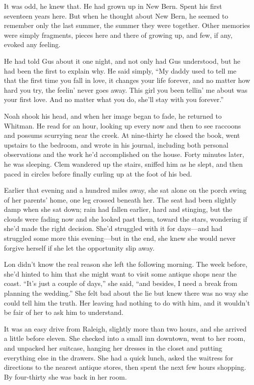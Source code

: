 \documentclass[10pt, twoside, openright]{book}
\begin{document}
It was odd, he knew that. He had grown up in New Bern. Spent his first
seventeen years here. But when he thought about New Bern, he seemed to
remember only the last summer, the summer they were together. Other
memories were simply fragments, pieces here and there of growing up, and
few, if any, evoked any feeling.

He had told Gus about it one night, and not only had Gus understood, but
he had been the first to explain why. He said simply, ``My daddy used to
tell me that the first time you fall in love, it changes your life
forever, and no matter how hard you try, the feelin' never goes away.
This girl you been tellin' me about was your first love. And no matter
what you do, she'll stay with you forever.''

Noah shook his head, and when her image began to fade, he returned to
Whitman. He read for an hour, looking up every now and then to see
raccoons and possums scurrying near the creek. At nine-thirty he closed
the book, went upstairs to the bedroom, and wrote in his journal,
including both personal observations and the work he'd accomplished on
the house. Forty minutes later, he was sleeping. Clem wandered up the
stairs, sniffed him as he slept, and then paced in circles before
finally curling up at the foot of his bed.

Earlier that evening and a hundred miles away, she sat alone on the
porch swing of her parents' home, one leg crossed beneath her. The seat
had been slightly damp when she sat down; rain had fallen earlier, hard
and stinging, but the clouds were fading now and she looked past them,
toward the stars, wondering if she'd made the right decision. She'd
struggled with it for days---and had struggled some more this
evening---but in the end, she knew she would never forgive herself if
she let the opportunity slip away.

Lon didn't know the real reason she left the following morning. The week
before, she'd hinted to him that she might want to visit some antique
shops near the coast. ``It's just a couple of days,'' she said, ``and
besides, I need a break from planning the wedding.'' She felt bad about
the lie but knew there was no way she could tell him the truth. Her
leaving had nothing to do with him, and it wouldn't be fair of her to
ask him to understand.

It was an easy drive from Raleigh, slightly more than two hours, and she
arrived a little before eleven. She checked into a small inn downtown,
went to her room, and unpacked her suitcase, hanging her dresses in the
closet and putting everything else in the drawers. She had a quick
lunch, asked the waitress for directions to the nearest antique stores,
then spent the next few hours shopping. By four-thirty she was back in
her room.
\end{document}
